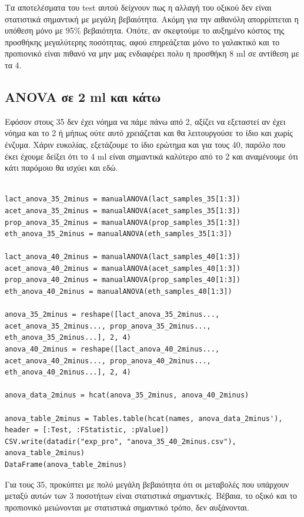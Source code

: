 \documentclass[11pt]{article}
\begin{document}
Τα αποτελέσματα του test αυτού δείχνουν πως η αλλαγή του οξικού δεν είναι στατιστικά σημαντική με μεγάλη βεβαιότητα. Ακόμη για την αιθανόλη απορρίπτεται η υπόθεση μόνο με 95\% βεβαιότητα. Οπότε, αν σκεφτούμε το αυξημένο κόστος της προσθήκης μεγαλύτερης ποσότητας, αφού επηρεάζεται μόνο το γαλακτικό και το προπιονικό είναι πιθανό να μην μας ενδιαφέρει πολυ η προσθήκη 8 ml σε αντίθεση με τα 4.

\subsection{ANOVA σε 2 ml και κάτω}
\label{sec:org8848659}
Εφόσον στους 35 δεν έχει νόημα να πάμε πάνω από 2, αξίζει να εξεταστεί αν έχει νόημα και το 2 ή μήπως ούτε αυτό χρειάζεται και θα λειτουργούσε το ίδιο και χωρίς ένζυμα. Χάριν ευκολίας, εξετάζουμε το ίδιο ερώτημα και για τους 40, παρόλο που έκει έχουμε δείξει ότι το 4 ml είναι σημαντικά καλύτερο από το 2 και αναμένουμε ότι κάτι παρόμοιο θα ισχύει και εδώ.

\begin{verbatim}

lact_anova_35_2minus = manualANOVA(lact_samples_35[1:3])
acet_anova_35_2minus = manualANOVA(acet_samples_35[1:3])
prop_anova_35_2minus = manualANOVA(prop_samples_35[1:3])
eth_anova_35_2minus = manualANOVA(eth_samples_35[1:3])

lact_anova_40_2minus = manualANOVA(lact_samples_40[1:3])
acet_anova_40_2minus = manualANOVA(acet_samples_40[1:3])
prop_anova_40_2minus = manualANOVA(prop_samples_40[1:3])
eth_anova_40_2minus = manualANOVA(eth_samples_40[1:3])

anova_35_2minus = reshape([lact_anova_35_2minus..., acet_anova_35_2minus..., prop_anova_35_2minus..., eth_anova_35_2minus...], 2, 4)
anova_40_2minus = reshape([lact_anova_40_2minus..., acet_anova_40_2minus..., prop_anova_40_2minus..., eth_anova_40_2minus...], 2, 4)

anova_data_2minus = hcat(anova_35_2minus, anova_40_2minus)

anova_table_2minus = Tables.table(hcat(names, anova_data_2minus'), header = [:Test, :FStatistic, :pValue])
CSV.write(datadir("exp_pro", "anova_35_40_2minus.csv"), anova_table_2minus)
DataFrame(anova_table_2minus)

\end{verbatim}

Για τους 35, προκύπτει με πολύ μεγάλη βεβαιότητα ότι οι μεταβολές που υπάρχουν μεταξύ αυτών των 3 ποσοτήτων είναι στατιστικά σημαντικές. Βέβαια, το οξικό και το προπιονικό μειώνονται με στατιστικά σημαντικό τρόπο, δεν αυξάνονται.
\end{document}
